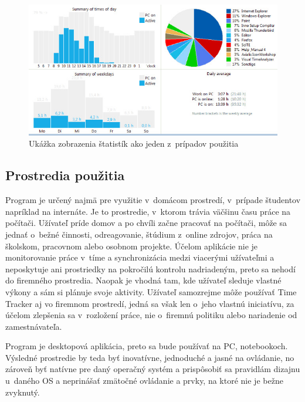 \documentclass[]{article}
\begin{document}
\begin{figure}[h!]
	\includegraphics[width=\textwidth]{pouzitie}
	\caption{Ukážka zobrazenia štatistík ako jeden z~prípadov použitia}
\end{figure}

\newpage

\subsection{Prostredia použitia}
Program je určený najmä pre využitie v~domácom prostredí, v~prípade študentov napríklad na internáte. Je to prostredie, v~ktorom trávia väčšinu času práce na počítači. Užívateľ príde domov a po chvíli začne pracovať na počítači, môže sa jednať o~bežné činnosti, odreagovanie, štúdium z~online zdrojov, práca na školskom, pracovnom alebo osobnom projekte. Účelom aplikácie nie je monitorovanie práce v~tíme a synchronizácia medzi viacerými užívateľmi a neposkytuje ani prostriedky na pokročilú kontrolu nadriadeným, preto sa nehodí do firemného prostredia. Naopak je vhodná tam, kde užívateľ sleduje vlastné výkony a sám si plánuje svoje aktivity. Užívateľ samozrejme môže používať Time Tracker aj vo firemnom prostredí, jedná sa však len o~jeho vlastnú iniciatívu, za účelom zlepšenia sa v~rozložení práce, nie o~firemnú politiku alebo nariadenie od zamestnávateľa.

Program je desktopová aplikácia, preto sa bude používať na PC, notebookoch. Výsledné prostredie by teda byť inovatívne, jednoduché a jasné na ovládanie, no zároveň byť natívne pre daný operačný systém a prispôsobiť sa pravidlám dizajnu\cite{windows_design_guidelines} u~daného OS a neprinášať zmätočné ovládanie a prvky, na ktoré nie je bežne zvyknutý.
\end{document}
